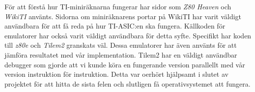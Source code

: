 \documentclass[main.tex]{subfiles}
\begin{document}
För att förstå hur TI-miniräknarna fungerar har sidor som {\it Z80 Heaven}
\cite{z80heaven} och {\it WikiTI} \cite{brandonw} använts. Sidorna om
miniräknarens portar på WikiTI har varit väldigt användbara för att få reda på
hur TI-ASIC:en ska fungera. Källkoden för emulatorer har också varit väldigt
användbara för detta syfte. Specifikt har koden till {\it z80e} \cite{z80e} och
{\it Tilem2} \cite{tilem2} granskats väl. Dessa emulatorer har även använts för
att jämföra resultatet med vår implementation. Tilem2 har en väldigt användbar
debugger som gjorde att vi kunde köra en fungerande version parallellt med vår
version instruktion för instruktion. Detta var oerhört hjälpsamt i slutet av
projektet för att hitta de sista felen och slutligen få operativsystemet att
fungera.

\clearpage
\end{document}

